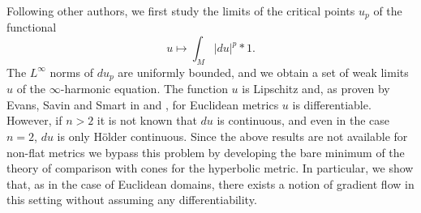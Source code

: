 \documentclass{ip-journal}
\theoremstyle{definition}
\numberwithin{equation}{section}
\newcommand{\R}{\mathbb R}
\begin{document}
%

Following other authors, we first study the limits of the critical points $u_p$ of the functional
\[
u \mapsto \int_M |du|^p *1.
\] 
The $L^\infty$ norms of $du_p$ are uniformly bounded, and we obtain a set of weak limits $u$ of the $\infty$-harmonic equation. The function $u$ is Lipschitz and, as proven by Evans, Savin and Smart in \cite{evans-savin} and \cite{evans-smart}, for Euclidean metrics $u$ is differentiable. However, if $n>2$ it is not known that $du$ is continuous,  and even in the case $n=2$,
$du$ is only H\"older continuous. Since the above results are not available  for non-flat metrics we 
bypass this problem by developing the bare minimum of the theory of comparison with cones for the hyperbolic metric. In particular, we show that, as in the case of Euclidean domains,  there exists a notion of  gradient flow in this setting without assuming any differentiability. 
  
\end{document}

